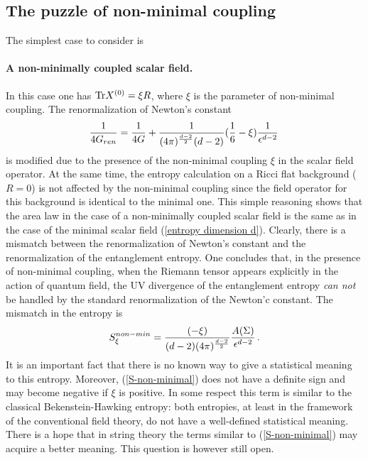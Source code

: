 \documentclass[12pt]{article}
\def\tr{\hbox{Tr}}
\def\be{\begin{eqnarray}}
\def\ee{\end{eqnarray}}
\def\lb{\label}
\def\o{\over}
\begin{document}
\subsection{The puzzle of non-minimal coupling}
\label{section: non-minimal coupling}

The simplest case to consider is 
\paragraph*{A non-minimally coupled scalar field.}  In this case one has  $\tr X^{(0)}=\xi R$, where $\xi$ is the parameter of non-minimal coupling. The renormalization of Newton's constant 
\be
{1\o 4G_{ren}}={1\o 4G}+{1\o (4\pi)^{d-2 \o 2}(d-2)}({1\o 6}-\xi){1\o \epsilon^{d-2}}\, 
\lb{non-minimal scalar}
\ee
is modified due to  the presence of the  non-minimal coupling $\xi$ in the scalar field operator.
At the same time, the entropy calculation on a Ricci flat background (${R}=0$) is not affected by the non-minimal coupling since the field operator for this background is identical to the minimal one. This simple reasoning shows that the area law in the case of a non-minimally coupled scalar field is the same as in the case of the minimal  scalar field (\ref{entropy dimension d}). Clearly, there is a mismatch between the renormalization of 
Newton's constant and the renormalization of  the entanglement entropy. One concludes that, in the presence of non-minimal coupling, when the Riemann tensor appears explicitly in the action of quantum field, the UV divergence of the entanglement entropy {\it can not} be handled by the 
standard renormalization of the Newton'c constant. The mismatch in the entropy is 
\be
S^{non-min}_\xi={(-\xi)\over (d-2)(4\pi)^{d-2\o 2}}{A(\Sigma)\over \epsilon^{d-2}}\, .
\lb{S-non-minimal}
\ee
It is an important fact that there is no known  way to give a statistical meaning to this entropy. Moreover, (\ref{S-non-minimal}) does not  have a definite sign  and may become negative if
$\xi$ is positive. In some respect this term is similar to the classical Bekenstein-Hawking entropy: both entropies, at least in the framework of the conventional field theory,  do not have a well-defined statistical meaning. There is a hope that in string theory the terms similar to  (\ref{S-non-minimal})
may acquire  a better meaning. This question is however still open.
\end{document}
